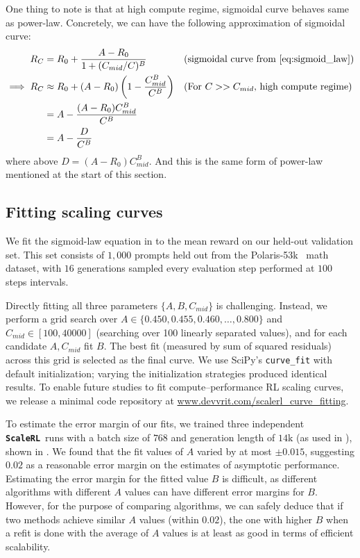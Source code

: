 \documentclass[]{fairmeta} %
\newcommand{\scalerl}{\texttt{\textbf{ScaleRL}}}
\begin{document}
One thing to note is that at high compute regime, sigmoidal curve behaves same as power-law. Concretely, we can have the following approximation of sigmoidal curve:
\begin{align*}
    R_C &= R_0 + \frac{A-R_0}{1 + (C_{mid}/C)^B} && \text{(sigmoidal curve from \cref{eq:sigmoid_law})} \\
    \implies R_C &\approx R_0 + (A-R_0)\left(1-\frac{C_{mid}^B}{C^B}\right) && \text{(For $C >> C_{mid}$, high compute regime)}\\
    &= A - \frac{(A-R_0)C_{mid}^B}{C^B}\\
    &= A - \frac{D}{C^B}
\end{align*}
where above $D = (A-R_0)C_{mid}^B$. And this is the same form of power-law mentioned at the start of this section.

\subsection{Fitting scaling curves} \label{appendix:fitting_curves}
We fit the sigmoid-law equation in  to the mean reward on our held-out validation set. 
This set consists of $1,000$ prompts held out from the Polaris-53k~\citep{polaris2025} math dataset, with $16$ generations sampled every evaluation step performed at $100$ steps intervals. 

Directly fitting all three parameters $\{A,B,C_{mid}\}$ is challenging. 
Instead, we perform a grid search over $A \in \{0.450, 0.455, 0.460, \ldots, 0.800\}$ and $C_{mid}\in [100, 40000]$ (searching over 100 linearly separated values), and for each candidate $A, C_{mid}$ fit $B$. 
The best fit (measured by sum of squared residuals) across this grid is selected as the final curve. 
We use SciPy’s \texttt{curve\_fit} with default initialization; varying the initialization strategies produced identical results. To enable future studies to fit compute–performance RL scaling curves, we release a minimal code repository at \href{https://www.devvrit.com/scalerl_curve_fitting}{www.devvrit.com/scalerl\_curve\_fitting}.

To estimate the error margin of our fits, we trained three independent \scalerl\ runs with a batch size of $768$ and generation length of $14\text{k}$ (as used in ), shown in . 
We found that the fit values of $A$ varied by at most $\pm 0.015$, suggesting $0.02$ as a reasonable error margin on the estimates of asymptotic performance. Estimating the error margin for the fitted value $B$ is difficult, as different algorithms with different $A$ values can have different error margins for $B$. However, for the purpose of comparing algorithms, we can safely deduce that if two methods achieve similar $A$ values (within $0.02$), the one with higher $B$ when a refit is done with the average of $A$ values is at least as good in terms of efficient scalability.
\end{document}
